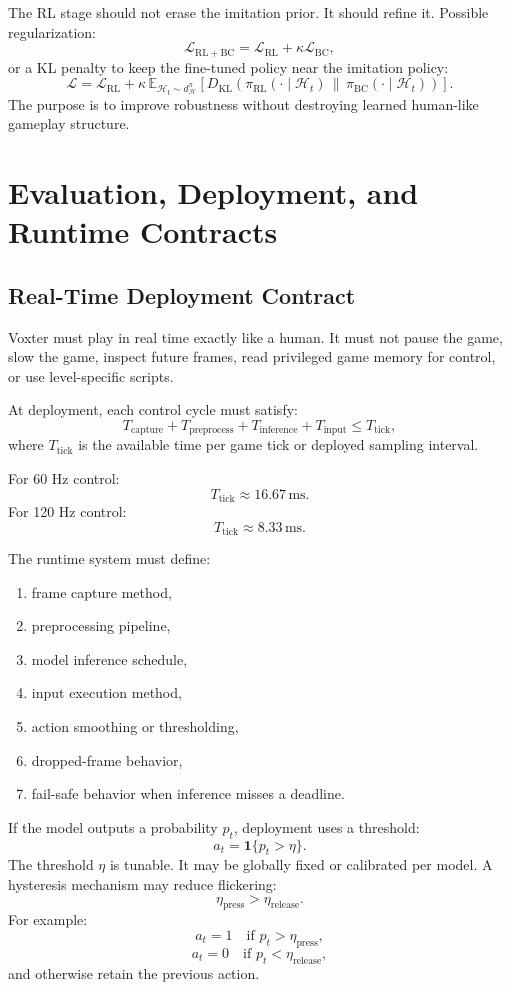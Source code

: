 \documentclass[11pt]{article}
\newcommand{\BC}{\mathrm{BC}}
\newcommand{\RL}{\mathrm{RL}}
\newcommand{\KL}{D_{\mathrm{KL}}}
\newcommand{\hist}{\mathcal{H}}
\newcommand{\dhist}[1]{d_{\mathcal{H}}^{#1}}
\newcommand{\indicator}[1]{\mathbf{1}\{#1\}}
\begin{document}
The RL stage should not erase the imitation prior. It should refine it. Possible regularization:
\[
  \mathcal{L}_{\RL+\BC}
  =
  \mathcal{L}_{\RL}
  +
  \kappa\mathcal{L}_{\BC},
\]
or a KL penalty to keep the fine-tuned policy near the imitation policy:
\[
  \mathcal{L}
  =
  \mathcal{L}_{\RL}
  +
  \kappa\,
  \mathbb{E}_{\hist_t \sim \dhist{\pi}}
  \left[
    \KL\!\left(
      \pi_{\RL}(\cdot \mid \hist_t)
      \,\|\, 
      \pi_{\BC}(\cdot \mid \hist_t)
    \right)
  \right].
\]
The purpose is to improve robustness without destroying learned human-like gameplay structure.

\section{Evaluation, Deployment, and Runtime Contracts}

\subsection{Real-Time Deployment Contract}

Voxter must play in real time exactly like a human. It must not pause the game, slow the game, inspect future frames, read privileged game memory for control, or use level-specific scripts.

At deployment, each control cycle must satisfy:
\[
  T_{\mathrm{capture}}
  +
  T_{\mathrm{preprocess}}
  +
  T_{\mathrm{inference}}
  +
  T_{\mathrm{input}}
  \le
  T_{\mathrm{tick}},
\]
where \(T_{\mathrm{tick}}\) is the available time per game tick or deployed sampling interval.

For 60 Hz control:
\[
  T_{\mathrm{tick}} \approx 16.67\,\mathrm{ms}.
\]
For 120 Hz control:
\[
  T_{\mathrm{tick}} \approx 8.33\,\mathrm{ms}.
\]

The runtime system must define:
\begin{enumerate}
  \item frame capture method,
  \item preprocessing pipeline,
  \item model inference schedule,
  \item input execution method,
  \item action smoothing or thresholding,
  \item dropped-frame behavior,
  \item fail-safe behavior when inference misses a deadline.
\end{enumerate}

If the model outputs a probability \(p_t\), deployment uses a threshold:
\[
  a_t = \indicator{p_t > \eta}.
\]
The threshold \(\eta\) is tunable. It may be globally fixed or calibrated per model. A hysteresis mechanism may reduce flickering:
\[
  \eta_{\mathrm{press}} > \eta_{\mathrm{release}}.
\]
For example:
\[
  a_t = 1 \quad \text{if } p_t > \eta_{\mathrm{press}},
\]
\[
  a_t = 0 \quad \text{if } p_t < \eta_{\mathrm{release}},
\]
and otherwise retain the previous action.
\end{document}
